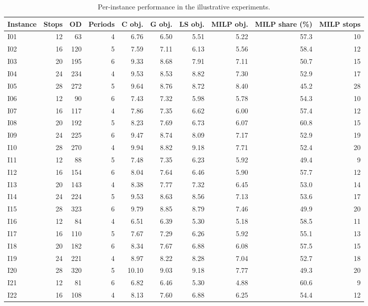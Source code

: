 \begin{table}[htbp]
\centering
\scriptsize
\setlength{\tabcolsep}{3.5pt}
\caption{Per-instance performance in the illustrative experiments.}
\label{tab:illustrative_instance_results_main}
\begin{tabular}{lrrrrrrrrr}
\toprule
Instance & Stops & OD & Periods & C obj. & G obj. & LS obj. & MILP obj. & MILP share (\%) & MILP stops \\
\midrule
I01 & 12 & 63 & 4 & 6.76 & 6.50 & 5.51 & 5.22 & 57.3 & 10 \\
I02 & 16 & 120 & 5 & 7.59 & 7.11 & 6.13 & 5.56 & 58.4 & 12 \\
I03 & 20 & 195 & 6 & 9.33 & 8.68 & 7.91 & 7.11 & 50.7 & 15 \\
I04 & 24 & 234 & 4 & 9.53 & 8.53 & 8.82 & 7.30 & 52.9 & 17 \\
I05 & 28 & 272 & 5 & 9.64 & 8.76 & 8.72 & 8.40 & 45.2 & 28 \\
I06 & 12 & 90 & 6 & 7.43 & 7.32 & 5.98 & 5.78 & 54.3 & 10 \\
I07 & 16 & 117 & 4 & 7.86 & 7.35 & 6.62 & 6.00 & 57.4 & 12 \\
I08 & 20 & 192 & 5 & 8.23 & 7.69 & 6.73 & 6.07 & 60.8 & 15 \\
I09 & 24 & 225 & 6 & 9.47 & 8.74 & 8.09 & 7.17 & 52.9 & 19 \\
I10 & 28 & 270 & 4 & 9.94 & 8.82 & 9.18 & 7.71 & 52.4 & 20 \\
I11 & 12 & 88 & 5 & 7.48 & 7.35 & 6.23 & 5.92 & 49.4 & 9 \\
I12 & 16 & 154 & 6 & 8.04 & 7.64 & 6.46 & 5.90 & 57.7 & 12 \\
I13 & 20 & 143 & 4 & 8.38 & 7.77 & 7.32 & 6.45 & 53.0 & 14 \\
I14 & 24 & 224 & 5 & 9.53 & 8.63 & 8.56 & 7.13 & 53.6 & 17 \\
I15 & 28 & 323 & 6 & 9.79 & 8.85 & 8.79 & 7.46 & 49.9 & 20 \\
I16 & 12 & 84 & 4 & 6.51 & 6.39 & 5.30 & 5.18 & 58.5 & 11 \\
I17 & 16 & 110 & 5 & 7.67 & 7.29 & 6.26 & 5.92 & 55.1 & 13 \\
I18 & 20 & 182 & 6 & 8.34 & 7.67 & 6.88 & 6.08 & 57.5 & 15 \\
I19 & 24 & 221 & 4 & 8.97 & 8.22 & 8.28 & 7.04 & 52.7 & 18 \\
I20 & 28 & 320 & 5 & 10.10 & 9.03 & 9.18 & 7.77 & 49.3 & 20 \\
I21 & 12 & 81 & 6 & 6.82 & 6.46 & 5.30 & 4.88 & 60.6 & 9 \\
I22 & 16 & 108 & 4 & 8.13 & 7.60 & 6.88 & 6.25 & 54.4 & 12 \\

\end{tabular}
\end{table}
